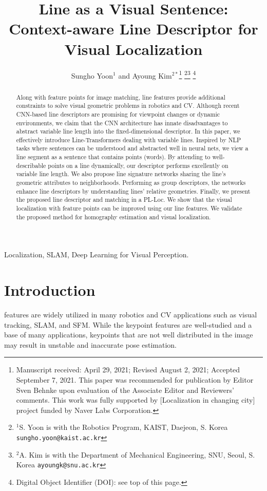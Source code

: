 \documentclass[letterpaper, 10 pt, journal, twoside]{ieeetran}
\title{\LARGE \bf
Line as a Visual Sentence: \\
Context-aware Line Descriptor for Visual Localization
}
\author{Sungho Yoon${}^{1}$ and Ayoung Kim${}^{2*}$\thanks{Manuscript received: April 29, 2021; Revised August 2, 2021; Accepted September 7, 2021. This paper was recommended for publication by Editor Sven Behnke upon evaluation of the Associate Editor and Reviewers' comments. This work was fully supported by [Localization in changing city] project funded by Naver Labs Corporation.} \thanks{$^{1}$S. Yoon is with the Robotics Program,
        KAIST, Daejeon, S. Korea {\tt\footnotesize sungho.yoon@kaist.ac.kr}}\thanks{$^{2}$A. Kim is with the Department of Mechanical Engineering, SNU, Seoul, S. Korea {\tt\footnotesize ayoungk@snu.ac.kr}}
\thanks{Digital Object Identifier (DOI): see top of this page.}
}
\begin{document}
\maketitle


\begin{abstract}
Along with feature points for image matching, line features provide additional constraints to solve visual geometric problems in robotics and \ac{CV}. Although recent \ac{CNN}-based line descriptors are promising for viewpoint changes or dynamic environments, we claim that the \ac{CNN} architecture has innate disadvantages to abstract variable line length into the fixed-dimensional descriptor. In this paper, we effectively introduce Line-Transformers dealing with variable lines. Inspired by \ac{NLP} tasks where sentences can be understood and abstracted well in neural nets, we view a line segment as a sentence that contains points (words). By attending to well-describable points on a line dynamically, our descriptor performs excellently on variable line length. We also propose line signature networks sharing the line's geometric attributes to neighborhoods. Performing as group descriptors, the networks enhance line descriptors by understanding lines' relative geometries. Finally, we present the proposed line descriptor and matching in a \ac{PL-Loc}. We show that the visual localization with feature points can be improved using our line features. We validate the proposed method for homography estimation and visual localization.
\end{abstract}

\begin{IEEEkeywords}
Localization, SLAM, Deep Learning for Visual Perception.
\end{IEEEkeywords}

\section{Introduction}
\label{sec:intro}


 features are widely utilized in many robotics and \acf{CV} applications such as visual tracking, \ac{SLAM}, and \ac{SFM}. While the keypoint features are well-studied and a base of many applications, keypoints that are not well distributed in the image may result in unstable and inaccurate pose estimation.
\end{document}
